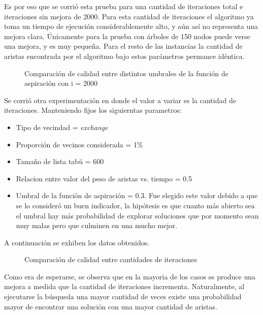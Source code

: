 Es por eso que se corrió esta prueba para una cantidad de iteraciones total e iteraciones sin mejora de 2000. Para esta cantidad de iteraciones el algoritmo ya toma un tiempo de ejecución considerablemente alto, y aún así no representa una mejora clara. Únicamente para la prueba con árboles de 150 nodos puede verse una mejora, y es muy pequeña. Para el resto de las instancias la cantidad de aristas encontrada por el algoritmo bajo estos parámetros permance idéntica.

\begin{figure}[H]
    \centering
    \caption{Comparación de calidad entre distintos umbrales de la función de aspiración con i = 2000}
    \pgfplotstabletypeset[
        columns={0, solutions, localsearch, highiterationlowaspiration, highiterationhighaspiration, highiterationfullaspiration}
    ]{\optimalsolutions}
\end{figure}

Se corrió otra experimentación en donde el valor a variar es la cantidad de iteraciones. Manteniendo fijos los siguierntas parametros:

\begin{itemize}
\item Tipo de vecindad = \textit{exchange}
\item Proporción de vecinos considerada = 1\%
\item Tamaño de lista tabú = 600
\item Relacion entre valor del peso de aristas vs. tiempo = 0.5
\item Umbral de la función de aspiración = 0.3. Fue elegido este valor debido
a que se lo consideró un buen indicador, la hipótesis es que cuanto más
abierto sea el umbral hay más probabilidad de explorar soluciones que por
momento sean muy malas pero que culminen en una mucho mejor.
\end{itemize}

A continuación se exhiben los datos obtenidos.

\begin{figure}[H]
    \centering
    \caption{Comparación de calidad entre cantidades de iteraciones}
    \pgfplotstabletypeset[
        columns={0, solutions, localsearch, lowiterationlowaspiration, highiterationlowaspiration, nolimititerationlowaspiration}
    ]{\optimalsolutions}
\end{figure}

Como era de esperarse, se observa que en la mayoria de los casos se produce
una mejora a medida que la cantidad de iteraciones incrementa. Naturalmente,
al ejecutarse la búsqueda una mayor cantidad de veces existe una probabilidad
mayor de encontrar una solución con una mayor cantidad de aristas.


